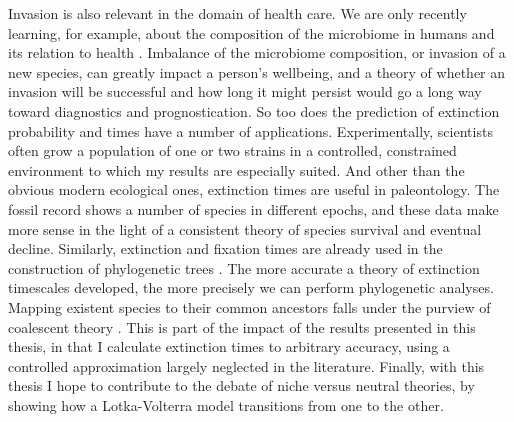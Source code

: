 Invasion is also relevant in the domain of health care. 
We are only recently learning, for example, about the composition of the microbiome in humans and its relation to health \cite{Coburn2015,Korem2015,Manichanh2010,Theriot2014,Kinross2011}. 
Imbalance of the microbiome composition, or invasion of a new species, can greatly impact a person's wellbeing, and a theory of whether an invasion will be successful and how long it might persist would go a long way toward diagnostics and prognostication.
So too does the prediction of extinction probability and times have a number of applications. 
Experimentally, scientists often grow a population of one or two strains in a controlled, constrained environment to which my results are especially suited. 
And other than the obvious modern ecological ones, extinction times are useful in paleontology. 
The fossil record shows a number of species in different epochs, and these data make more sense in the light of a consistent theory of species survival and eventual decline. %
Similarly, extinction and fixation times are already used in the construction of phylogenetic trees \cite{Rogers2014,Rice2004,Blythe2007}. 
The more accurate a theory of extinction timescales developed, the more precisely we can perform phylogenetic analyses. 
Mapping existent species to their common ancestors falls under the purview of coalescent theory \cite{Kingman1982}. %
This is part of the impact of the results presented in this thesis, in that I calculate extinction times to arbitrary accuracy, using a controlled approximation largely neglected in the literature. %
Finally, with this thesis I hope to contribute to the debate of niche versus neutral theories, by showing how a Lotka-Volterra model transitions from one to the other. 






